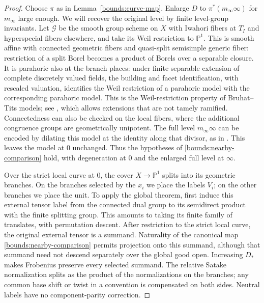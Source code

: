 \documentclass[11pt]{article}
\numberwithin{equation}{section}
\theoremstyle{definition}
\theoremstyle{remark}
\begin{document}
\begin{proof}
Choose $\pi$ as in Lemma~\ref{bounds:curve-map}.  Enlarge $D$ to
$\pi^*(m_\infty\infty)$ for $m_\infty$ large enough.  We will recover the
original level by finite level-group invariants.  Let $\mathcal G$ be
the smooth group scheme on $X$ with Iwahori fibers at $T_I$ and
hyperspecial fibers elsewhere, and take its Weil restriction to
$\mathbb P^1$.  This is smooth affine with connected geometric fibers
and quasi-split semisimple generic fiber: restriction of a split Borel
becomes a product of Borels over a separable closure.  It is parahoric
also at the branch places: under finite separable extension of complete discretely valued
fields, the building and facet identification, with rescaled
valuation, identifies the Weil restriction of a parahoric model with
the corresponding parahoric model.  This is the Weil-restriction
property of Bruhat--Tits models; see
\cite[Appendix~F, Fact~F.1]{Bounds:KalethaWeilRestriction}, which
allows extensions that are not tamely ramified.  Connectedness can also be checked on
the local fibers, where the additional congruence groups are
geometrically unipotent.  The full level $m_\infty\infty$ can be encoded by dilating this
model at the identity along that divisor, as in
\cite[Section~2]{Bounds:SalmonNearby}.  This leaves the model at $0$
unchanged.  Thus the hypotheses of \eqref{bounds:nearby-comparison}
hold, with degeneration at $0$ and the enlarged full level at
$\infty$.

Over the strict local curve at $0$, the cover $X\to\mathbb P^1$ splits
into its geometric branches.  On the branches selected by the $x_i$
we place the labels $V_i$; on the other branches we place the unit.
To apply the global theorem, first induce this external tensor label
from the connected dual group to its semidirect product with the finite
splitting group.  This amounts to taking its finite family of
translates, with permutation descent.  After restriction to the strict
local curve, the original external tensor is a summand.  Naturality of
the canonical map \eqref{bounds:nearby-comparison} permits projection
onto this summand, although that summand need not descend separately
over the global good open.  Increasing $D_*$ makes Frobenius preserve
every selected summand.  The relative Satake normalization splits as
the product of the normalizations on the branches; any common base
shift or twist in a convention is compensated on both sides.  Neutral
labels have no component-parity correction.


\end{proof}
\end{document}
